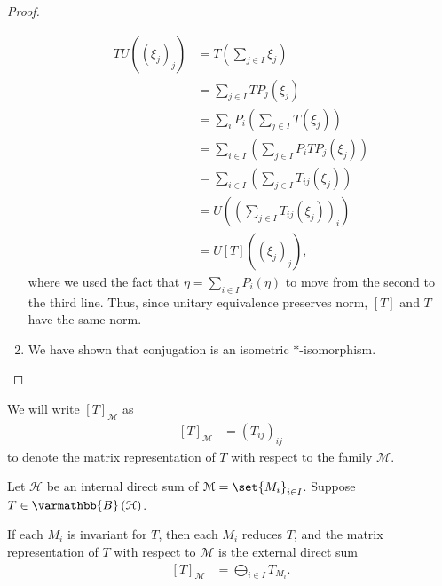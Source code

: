 \documentclass[10pt]{mypackage}
\renewcommand*{\mathbb}[1]{\varmathbb{#1}}
\newcommand{\B}{\mathbb{B}}
\begin{document}
\begin{proof}
\begin{enumerate}[(1)]
      \begin{align*}
        TU\left(\left(\xi_j\right)_j\right) &= T\left(\sum_{j\in I}\xi_j\right)\\
                                            &= \sum_{j\in I}TP_j\left(\xi_j\right)\\
                                            &= \sum_{i}P_i\left(\sum_{j\in I}T\left(\xi_j\right)\right)\\
                                            &= \sum_{i\in I}\left(\sum_{j\in I}P_iTP_j\left(\xi_j\right)\right)\\
                                            &= \sum_{i\in I}\left(\sum_{j\in I}T_{ij}\left(\xi_j\right)\right)\\
                                            &= U\left(\left(\sum_{j\in I}T_{ij}\left(\xi_j\right)\right)_i\right)\\
                                            &= U\left[T\right]\left(\left(\xi_j\right)_j\right),
      \end{align*}
      where we used the fact that $\eta = \sum_{i\in I}P_i\left(\eta\right)$ to move from the second to the third line. Thus, since unitary equivalence preserves norm, $\left[T\right]$ and $T$ have the same norm.
    \item We have shown that conjugation is an isometric $\ast$-isomorphism.
  \end{enumerate}
\end{proof}
\begin{remark}
  We will write $\left[T\right]_{\mathcal{M}}$ as
  \begin{align*}
    \left[T\right]_{\mathcal{M}} &= \left(T_{ij}\right)_{ij}
  \end{align*}
  to denote the matrix representation of $T$ with respect to the family $\mathcal{M}$.
\end{remark}
\begin{proposition}
  Let $\mathcal{H}$ be an internal direct sum of $\mathcal{M} = \set{M_{i}}_{i\in I}$. Suppose $T\in \B\left(\mathcal{H}\right)$.\newline

  If each $M_i$ is invariant for $T$, then each $M_i$ reduces $T$, and the matrix representation of $T$ with respect to $\mathcal{M}$ is the external direct sum
  \begin{align*}
    \left[T\right]_{\mathcal{M}} &= \bigoplus_{i\in I}T_{M_i}.
  \end{align*}
\end{proposition}
\end{document}
